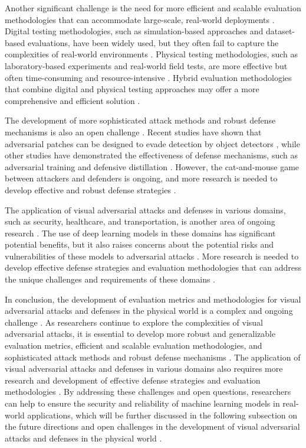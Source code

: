 \documentclass[11pt,a4paper]{article}
\begin{document}
Another significant challenge is the need for more efficient and scalable evaluation methodologies that can accommodate large-scale, real-world deployments \cite{doi:10.1109/icpr48806.2021.9412236}. Digital testing methodologies, such as simulation-based approaches and dataset-based evaluations, have been widely used, but they often fail to capture the complexities of real-world environments \cite{doi:10.1109/access.2023.3321118}. Physical testing methodologies, such as laboratory-based experiments and real-world field tests, are more effective but often time-consuming and resource-intensive \cite{doi:10.1007/978-3-030-58589-1_3}. Hybrid evaluation methodologies that combine digital and physical testing approaches may offer a more comprehensive and efficient solution \cite{doi:10.1109/tgrs.2022.3225306}.

The development of more sophisticated attack methods and robust defense mechanisms is also an open challenge \cite{doi:10.1007/s11633-019-1211-x}. Recent studies have shown that adversarial patches can be designed to evade detection by object detectors \cite{doi:10.1109/cvprw.2019.00012}, while other studies have demonstrated the effectiveness of defense mechanisms, such as adversarial training and defensive distillation \cite{doi:10.1016/j.eng.2019.12.012}. However, the cat-and-mouse game between attackers and defenders is ongoing, and more research is needed to develop effective and robust defense strategies \cite{arxiv:2007.16118}.

The application of visual adversarial attacks and defenses in various domains, such as security, healthcare, and transportation, is another area of ongoing research \cite{doi:10.1109/jstars.2024.3422377}. The use of deep learning models in these domains has significant potential benefits, but it also raises concerns about the potential risks and vulnerabilities of these models to adversarial attacks \cite{doi:10.1109/cvprw56347.2022.00034}. More research is needed to develop effective defense strategies and evaluation methodologies that can address the unique challenges and requirements of these domains \cite{doi:10.1007/s10462-024-10841-z}.

In conclusion, the development of evaluation metrics and methodologies for visual adversarial attacks and defenses in the physical world is a complex and ongoing challenge \cite{doi:10.58496/adsa/2024/011}. As researchers continue to explore the complexities of visual adversarial attacks, it is essential to develop more robust and generalizable evaluation metrics, efficient and scalable evaluation methodologies, and sophisticated attack methods and robust defense mechanisms \cite{doi:10.1109/vrw62533.2024.00284}. The application of visual adversarial attacks and defenses in various domains also requires more research and development of effective defense strategies and evaluation methodologies \cite{arxiv:2409.20426}. By addressing these challenges and open questions, researchers can help to ensure the security and reliability of machine learning models in real-world applications, which will be further discussed in the following subsection on the future directions and open challenges in the development of visual adversarial attacks and defenses in the physical world \cite{doi:10.1109/tpami.2024.3430860}.
\end{document}
